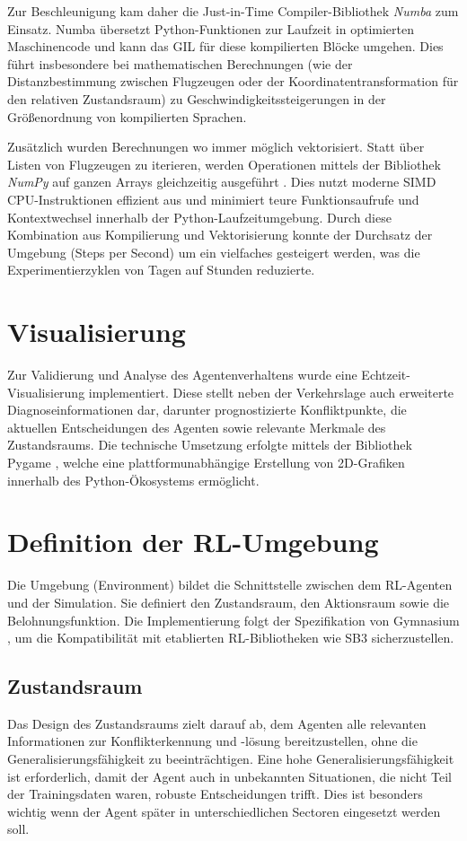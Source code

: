 Zur Beschleunigung kam daher die Just-in-Time Compiler-Bibliothek \emph{Numba} \cite{numba} zum Einsatz. Numba übersetzt Python-Funktionen zur Laufzeit in optimierten Maschinencode und kann das \ac{GIL} für diese kompilierten Blöcke umgehen. Dies führt insbesondere bei mathematischen Berechnungen (wie der Distanzbestimmung zwischen Flugzeugen oder der Koordinatentransformation für den relativen Zustandsraum) zu Geschwindigkeitssteigerungen in der Größenordnung von kompilierten Sprachen.
\medskip

Zusätzlich wurden Berechnungen wo immer möglich vektorisiert. Statt über Listen von Flugzeugen zu iterieren, werden Operationen mittels der Bibliothek \emph{NumPy} auf ganzen Arrays gleichzeitig ausgeführt \cite{numpy}. Dies nutzt moderne \acs{SIMD} CPU-Instruktionen effizient aus und minimiert teure Funktionsaufrufe und Kontextwechsel innerhalb der Python-Laufzeitumgebung. Durch diese Kombination aus Kompilierung und Vektorisierung konnte der Durchsatz der Umgebung (Steps per Second) um ein vielfaches gesteigert werden, was die Experimentierzyklen von Tagen auf Stunden reduzierte.

\section{Visualisierung}
Zur Validierung und Analyse des Agentenverhaltens wurde eine Echtzeit\hyp{}Visualisierung implementiert.
Diese stellt neben der Verkehrslage auch erweiterte Diagnoseinformationen dar, darunter prognostizierte Konfliktpunkte, die aktuellen Entscheidungen des Agenten sowie relevante Merkmale des Zustandsraums.
Die technische Umsetzung erfolgte mittels der Bibliothek Pygame \cite{pygame}, welche eine plattformunabhängige Erstellung von 2D\hyp{}Grafiken innerhalb des Python\hyp{}Ökosystems ermöglicht.

\section{Definition der RL\hyp{}Umgebung}
Die Umgebung (Environment) bildet die Schnittstelle zwischen dem \ac{RL}\hyp{}Agenten und der Simulation. 
Sie definiert den Zustandsraum, den Aktionsraum sowie die Belohnungsfunktion.
Die Implementierung folgt der Spezifikation von Gymnasium \cite{gymnasium}, um die Kompatibilität mit etablierten \ac{RL}\hyp{}Bibliotheken wie \ac{SB3} \cite{sb3} sicherzustellen.

\subsection{Zustandsraum}
Das Design des Zustandsraums zielt darauf ab, dem Agenten alle relevanten Informationen zur Konflikterkennung und \hyp{}lösung bereitzustellen, ohne die Generalisierungsfähigkeit zu beeinträchtigen. 
Eine hohe Generalisierungsfähigkeit ist erforderlich, damit der Agent auch in unbekannten Situationen, die nicht Teil der Trainingsdaten waren, robuste Entscheidungen trifft. Dies ist besonders wichtig wenn der Agent später in unterschiedlichen Sectoren eingesetzt werden soll.

